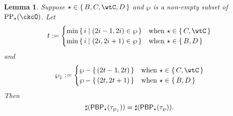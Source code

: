 \documentclass[12pt,a4paper]{amsart}
\numberwithin{equation}{section}
\newtheorem{lem}[thm]{Lemma}
\theoremstyle{remark}
\def\CPPs{\mathrm{PP}_{\star}}
\def\PBP{\mathsf{PBP}}
\begin{document}

\begin{lem}\label{lem:down}
  Suppose $\star \in \set{B, C, \wtC, D}$ and
  $\wp$ is a non-empty subset of $\CPPs(\ckcO)$.
  Let
  \[
    t:=
    \begin{cases}
      \min\set{i|(2i-1,2i)\in \wp} & \text{when $\star \in \set{C,\wtC}$}\\
      \min\set{i|(2i,2i+1)\in \wp} & \text{when $\star \in \set{B,D}$}\\
    \end{cases}
  \]
  and
  \[
    \PPm:=
    \begin{cases}
      \wp - \set{(2t-1,2t)}  & \text{when $\star \in \set{C,\wtC}$}\\
      \wp -  \set{(2t,2t+1)} & \text{when $\star \in \set{B,D}$}\\
    \end{cases}
  \]
  Then
  \[
    \sharp(\PBP_{\star}(\tau_{\PPm})) = \sharp(\PBP_{\star}(\tau_{\wp})).
  \]
\end{lem}
\end{document}
